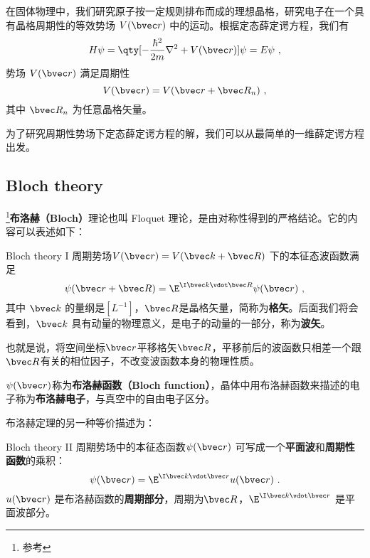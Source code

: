 


在固体物理中，我们研究原子按一定规则排布而成的理想晶格，研究电子在一个具有晶格周期性的等效势场 $V(\bvec r)$ 中的运动。根据定态薛定谔方程，我们有
\begin{equation}\label{eq_Bloch_4}
H\psi=\qty[-\frac{\hbar^2}{2m}\nabla^2+V(\bvec r)] \psi = E\psi~,
\end{equation}
势场 $V(\bvec r)$ 满足周期性
\begin{equation}
V(\bvec r)=V(\bvec r+\bvec R_n)~,
\end{equation}
其中 $\bvec R_n$ 为任意晶格矢量。

为了研究周期性势场下定态薛定谔方程的解，我们可以从最简单的一维薛定谔方程出发。

\subsection{Bloch theory}
\footnote{参考\cite{GriffQ}}\textbf{布洛赫（Bloch）}理论也叫 Floquet 理论，是由对称性得到的严格结论。它的内容可以表述如下：

\begin{theorem}{Bloch theory I}
周期势场$V(\bvec r) = V(\bvec k + \bvec R)$ 下的本征态波函数满足
\begin{equation}\label{eq_Bloch_1}
\psi(\bvec r + \bvec R) = \E^{\I \bvec k \vdot \bvec R}\psi(\bvec r)~,
\end{equation}
其中 $\bvec k$ 的量纲是$[L^{-1}]$，$\bvec R$是晶格矢量，简称为\textbf{格矢}。后面我们将会看到，$\bvec k$ 具有动量的物理意义，是电子的动量的一部分，称为\textbf{波矢}。 
\end{theorem} 

也就是说，将空间坐标$\bvec r$平移格矢$\bvec R$，平移前后的波函数只相差一个跟$\bvec R$有关的相位因子，不改变波函数本身的物理性质。

$\psi (\bvec r)$称为\textbf{布洛赫函数（Bloch function）}，晶体中用布洛赫函数来描述的电子称为\textbf{布洛赫电子}，与真空中的自由电子区分。

布洛赫定理的另一种等价描述为：

\begin{theorem}{Bloch theory II}
周期势场中的本征态函数$\psi(\bvec r)$ 可写成一个\textbf{平面波}和\textbf{周期性函数}的乘积：
\begin{equation}\label{eq_Bloch_2}
\psi(\bvec r) = \E^{\I \bvec k \vdot \bvec r} u(\bvec r)~.
\end{equation}
$u( \bvec r)$ 是布洛赫函数的\textbf{周期部分}，周期为$\bvec R$，$\E^{\I \bvec k \vdot \bvec r}$ 是平面波部分。
\end{theorem}


